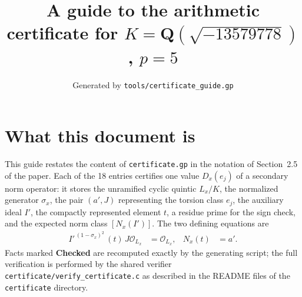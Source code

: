 \documentclass[11pt]{article}
\title{A guide to the arithmetic certificate for $K=\mathbf Q(\sqrt{-13579778})$, $p=5$}
\author{}
\date{Generated by \texttt{tools/certificate\_guide.gp}}
\begin{document}
\maketitle
\section*{What this document is}
This guide restates the content of \texttt{certificate.gp} in the
notation of Section~2.5 of the paper.  Each of the 18 entries
certifies one value $D_x(e_j)$ of a secondary norm operator: it
stores the unramified cyclic quintic $L_x/K$, the normalized
generator $\sigma_x$, the pair $(a',J)$ representing the torsion
class $e_j$, the auxiliary ideal $I'$, the compactly represented
element $t$, a residue prime for the sign check, and the expected
norm class $[N_x(I')]$.  The two defining equations are
\begin{align*}
I'^{\,(1-\sigma_x)^2}\,(t)\,J\mathcal O_{L_x}&=\mathcal O_{L_x},&
N_x(t)&=a'.
\end{align*}
Facts marked \textbf{Checked} are recomputed exactly by the
generating script; the full verification is performed by the
shared verifier \texttt{certificate/verify\_certificate.c} as
described in the README files of the \texttt{certificate}
directory.
\end{document}
